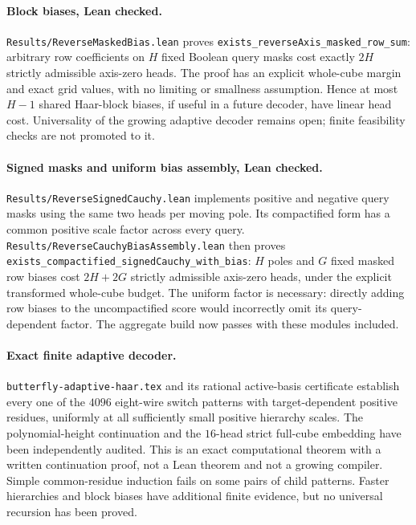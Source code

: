 \documentclass[11pt]{article}
\begin{document}
\paragraph{Block biases, Lean checked.}
\texttt{Results/ReverseMaskedBias.lean} proves
\texttt{exists\_reverseAxis\_masked\_row\_sum}: arbitrary row coefficients
on $H$ fixed Boolean query masks cost exactly $2H$ strictly admissible
axis-zero heads. The proof has an explicit whole-cube margin and exact
grid values, with no limiting or smallness assumption. Hence at most
$H-1$ shared Haar-block biases, if useful in a future decoder, have
linear head cost. Universality of the growing adaptive decoder remains
open; finite feasibility checks are not promoted to it.

\paragraph{Signed masks and uniform bias assembly, Lean checked.}
\texttt{Results/ReverseSignedCauchy.lean} implements positive and
negative query masks using the same two heads per moving pole. Its
compactified form has a common positive scale factor across every
query. \texttt{Results/ReverseCauchyBiasAssembly.lean} then proves
\texttt{exists\_compactified\_signedCauchy\_with\_bias}: $H$ poles
and $G$ fixed masked row biases cost $2H+2G$ strictly admissible
axis-zero heads, under the explicit transformed whole-cube budget.
The uniform factor is necessary: directly adding row biases to the
uncompactified score would incorrectly omit its query-dependent
factor. The aggregate build now passes with these modules included.

\paragraph{Exact finite adaptive decoder.}
\texttt{butterfly-adaptive-haar.tex} and its rational active-basis
certificate establish every one of the $4096$ eight-wire switch
patterns with target-dependent positive residues, uniformly at all
sufficiently small positive hierarchy scales. The polynomial-height
continuation and the $16$-head strict full-cube embedding have been
independently audited. This is an exact computational theorem with a
written continuation proof, not a Lean theorem and not a growing
compiler. Simple common-residue induction fails on some pairs of
child patterns. Faster hierarchies and block biases have additional
finite evidence, but no universal recursion has been proved.
\end{document}
